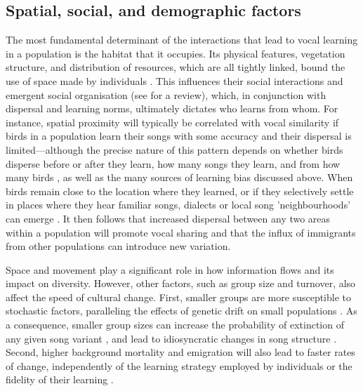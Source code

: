 \subsection{Spatial, social, and demographic factors}
The most fundamental determinant of the interactions that lead to vocal learning in a population is the habitat that it occupies. Its physical features, vegetation structure, and distribution of resources, which are all tightly linked, bound the use of space made by individuals \autocite{spiegel2016, albery2021, firth2016}. This influences their social interactions and emergent social organisation (see \cite{he2019} for a review), which, in conjunction with dispersal and learning norms, ultimately dictates who learns from whom. For instance, spatial proximity will typically be correlated with vocal similarity if birds in a population learn their songs with some accuracy and their dispersal is limited---although the precise nature of this pattern depends on whether birds disperse before or after they learn, how many songs they learn, and from how many birds \autocite{ellers2003,williams1990}, as well as the many sources of learning bias discussed above. When birds remain close to the location where they learned, or if they selectively settle in places where they hear familiar songs, dialects or local song 'neighbourhoods’ can emerge \autocite{podos2007}. It then follows that increased dispersal between any two areas within a population will promote vocal sharing and that the influx of immigrants from other populations can introduce new variation.

Space and movement play a significant role in how information flows and its impact on diversity. However, other factors, such as group size and turnover, also affect the speed of cultural change. First, smaller groups are more susceptible to stochastic factors, paralleling the effects of genetic drift on small populations \autocite{kimura1964}. As a consequence, smaller group sizes can increase the probability of extinction of any given song variant \autocite{nunn2009}, and lead to idiosyncratic changes in song structure \autocite{lachlan2013}. Second, higher background mortality and emigration will also lead to faster rates of change, independently of the learning strategy employed by individuals or the fidelity of their learning \autocite{nunn2009,Slater1986}.

